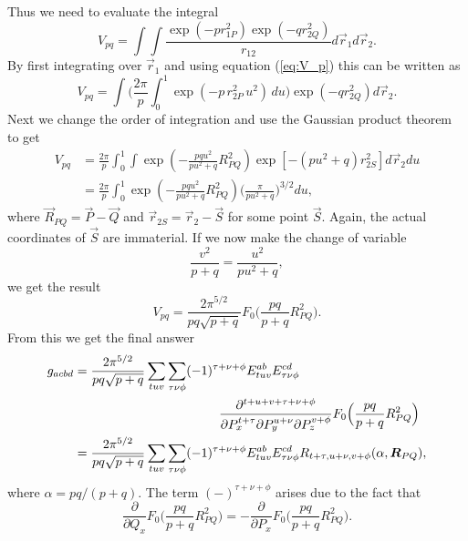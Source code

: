 Thus we need to evaluate the integral
\begin{equation}
 V_{pq} = \int\int\frac{\exp(-pr^2_{1P})\exp(-qr^2_{2Q})}{r_{12}}d \vec r_1 d\vec r_2.
\end{equation}
By first integrating over $\vec r_1$ and using equation (\ref{eq:V_p}) this can be written as
\begin{equation}
 V_{pq} = \int\Big(\frac{2\pi}{p}\int_0^1\exp(-p\,r^2_{2P}\,u^2)\,du\Big)\exp(-qr^2_{2Q}) d \vec r_2.
\end{equation}
Next we change the order of integration and use the Gaussian product theorem to get
\begin{equation}
\begin{split}
 V_{pq} & = \frac{2\pi}{p}\int_0^1\int\exp(-\frac{pqu^2}{pu^2+q}R^2_{PQ})\exp[-(pu^2+q)r_{2S}^2] d\vec r_2 du \\
        & = \frac{2\pi}{p}\int_0^1\exp(-\frac{pqu^2}{pu^2+q}R^2_{PQ})\Big(\frac{\pi}{pu^2+q}\Big)^{3/2} du,
\end{split}
\end{equation}
where $\vec R_{PQ} = \vec P - \vec Q$ and $\vec r_{2S} = \vec r_2 - \vec S$ for some point $\vec S$. Again, the actual coordinates of 
$\vec S$ are immaterial. If we now make the change of variable
\begin{equation}
 \frac{v^2}{p+q} = \frac{u^2}{pu^2+q},
\end{equation}
we get the result
\begin{equation}
 V_{pq} = \frac{2\pi^{5/2}}{pq\sqrt{p+q}}F_0\Big(\frac{pq}{p+q}R^2_{PQ}\Big).
\end{equation}
From this we get the final answer
\begin{equation}
\begin{split}
 g_{acbd} & = \frac{2\pi^{5/2}}{pq\sqrt{p+q}}\sum_{tuv}\sum_{\tau\nu\phi}(-1)^{\tau+\nu+\phi}E^{ab}_{tuv}E^{cd}_{\tau\nu\phi} \\
          & \hspace{40mm} \frac{\partial^{t+u+v+\tau+\nu+\phi}}{\partial P_x^{t+\tau} \partial P_y^{u+\nu} \partial P_z^{v+\phi}}F_0\Big(\frac{pq}{p+q}R^2_{PQ}\Big) \\
          & = \frac{2\pi^{5/2}}{pq\sqrt{p+q}}\sum_{tuv}\sum_{\tau\nu\phi}(-1)^{\tau+\nu+\phi}E^{ab}_{tuv}E^{cd}_{\tau\nu\phi}R_{t+\tau,u+\nu,v+\phi}(\alpha,\vec R_{PQ}),
\end{split}
\end{equation}
where $\alpha = pq/(p+q)$. The term $(-)^{\tau+\nu+\phi}$ arises due to the fact that
\begin{equation}
\frac{\partial}{\partial Q_x} F_0\Big(\frac{pq}{p+q}R^2_{PQ}\Big) = - \frac{\partial}{\partial P_x} F_0\Big(\frac{pq}{p+q}R^2_{PQ}\Big).
\end{equation}




